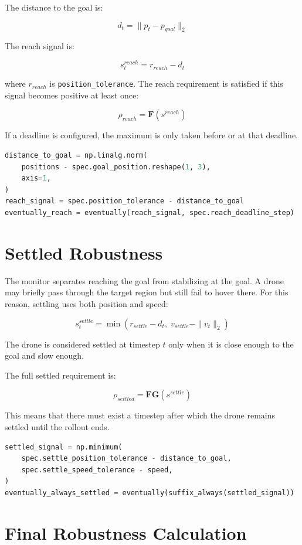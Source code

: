 \documentclass[11pt]{article}
\newcommand{\code}[1]{\texttt{#1}}
\newcommand{\rob}{\rho}
\begin{document}
The distance to the goal is:

\[
d_t = \|p_t - p_{goal}\|_2
\]

The reach signal is:

\[
s^{reach}_t = r_{reach} - d_t
\]

where \(r_{reach}\) is \code{position\_tolerance}. The reach requirement is satisfied if this signal becomes positive at least once:

\[
\rob_{reach} = \mathbf{F}(s^{reach})
\]

If a deadline is configured, the maximum is only taken before or at that deadline.

\begin{lstlisting}[language=Python]
distance_to_goal = np.linalg.norm(
    positions - spec.goal_position.reshape(1, 3),
    axis=1,
)
reach_signal = spec.position_tolerance - distance_to_goal
eventually_reach = eventually(reach_signal, spec.reach_deadline_step)
\end{lstlisting}

\section{Settled Robustness}

The monitor separates reaching the goal from stabilizing at the goal. A drone may briefly pass through the target region but still fail to hover there. For this reason, settling uses both position and speed:

\[
s^{settle}_t =
\min(r_{settle} - d_t,\; v_{settle} - \|v_t\|_2)
\]

The drone is considered settled at timestep \(t\) only when it is close enough to the goal and slow enough.

The full settled requirement is:

\[
\rob_{settled} =
\mathbf{F}\mathbf{G}(s^{settle})
\]

This means that there must exist a timestep after which the drone remains settled until the rollout ends.

\begin{lstlisting}[language=Python]
settled_signal = np.minimum(
    spec.settle_position_tolerance - distance_to_goal,
    spec.settle_speed_tolerance - speed,
)
eventually_always_settled = eventually(suffix_always(settled_signal))
\end{lstlisting}

\section{Final Robustness Calculation}
\end{document}
